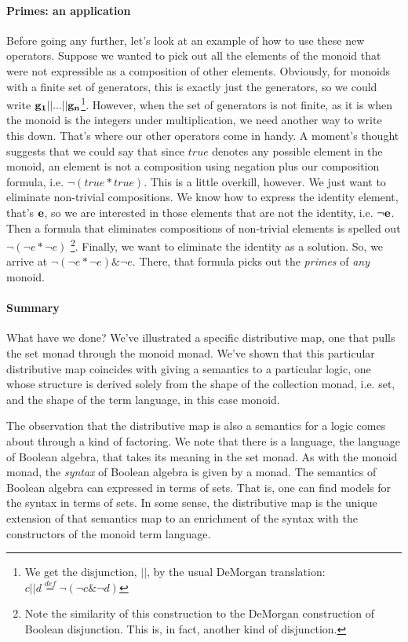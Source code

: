 \paragraph{Primes: an application}
Before going any further, let's look at an example of how to use these
new operators. Suppose we wanted to pick out all the elements of the
monoid that were not expressible as a composition of other
elements. Obviously, for monoids with a finite set of generators, this
is exactly just the generators, so we could write $\bf{g_1} || ... ||
\bf{g_n}$\footnote{We get the disjunction, $||$, by the usual DeMorgan
  translation: $c || d \stackrel{def}{=} \neg( \neg c \& \neg
  d)$}. However, when the set of generators is not finite, as it is
when the monoid is the integers under multiplication, we need another
way to write this down. That's where our other operators come in
handy. A moment's thought suggests that we could say that since $true$
denotes any possible element in the monoid, an element is not a
composition using negation plus our composition formula, i.e. $\neg
(true * true)$. This is a little overkill, however. We just want to
eliminate non-trivial compositions. We know how to express the
identity element, that's $\bf{e}$, so we are interested in those
elements that are not the identity, i.e. $\neg \bf{e}$. Then a formula
that eliminates compositions of non-trivial elements is spelled out
$\neg (\neg e * \neg e)$ \footnote{Note the similarity of this
  construction to the DeMorgan construction of Boolean
  disjunction. This is, in fact, another kind of
  disjunction.}. Finally, we want to eliminate the identity as a
solution. So, we arrive at $\neg (\neg e * \neg e) \& \neg e$. There,
that formula picks out the \emph{primes} of \emph{any} monoid.

\paragraph{Summary}

What have we done? We've illustrated a specific distributive map, one
that pulls the set monad through the monoid monad. We've shown that
this particular distributive map coincides with giving a semantics to
a particular logic, one whose structure is derived solely from the
shape of the collection monad, i.e. set, and the shape of the term
language, in this case monoid.

The observation that the distributive map is also a semantics for a
logic comes about through a kind of factoring. We note that there is a
language, the language of Boolean algebra, that takes its meaning in
the set monad. As with the monoid monad, the \emph{syntax} of Boolean
algebra is given by a monad. The semantics of Boolean algebra can
expressed in terms of sets. That is, one can find models for the
syntax in terms of sets. In some sense, the distributive map is the
unique extension of that semantics map to an enrichment of the syntax
with the constructors of the monoid term language.

